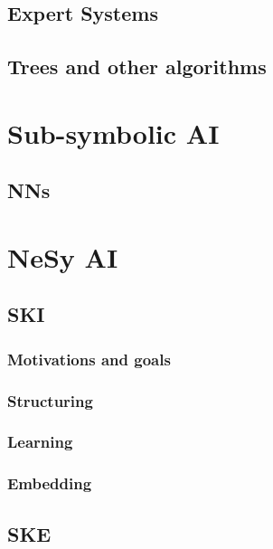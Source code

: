 \documentclass[12pt,a4paper,openright,twoside]{book}
\begin{document}
\subsection{Expert Systems}\label{subsec:expert-systems}

\subsection{Trees and other algorithms}\label{subsec:trees-and-other-algorithms}

\section{Sub-symbolic \ac{AI}}\label{sec:sub-symbolic-ai}

\subsection{\Aclp{NN}}\label{subsec:neural-networks}

\section{\Acl{NeSy} \ac{AI}}\label{sec:nesy-ai}

\subsection{\Acl{SKI}}\label{subsec:ski}

\subsubsection{Motivations and goals}\label{subsubsec:ski-motivations-and-goals}

\subsubsection{Structuring}\label{subsubsec:structuring}

\subsubsection{Learning}\label{subsubsec:learning}

\subsubsection{Embedding}\label{subsubsec:embedding}

\subsection{\Acl{SKE}}\label{subsec:ske}
\end{document}
